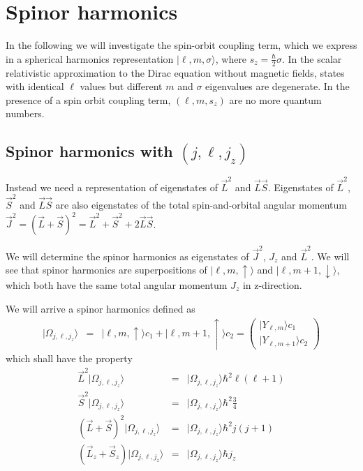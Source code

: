 \documentclass[11pt,a4paper]{report}
\begin{document}
%
\chapter{Spinor harmonics}
In the following we will investigate the spin-orbit coupling term,
which we express in a spherical harmonics representation
$|\ell,m,\sigma\rangle$, where $s_z=\frac{\hbar}{2}\sigma$.  In the
scalar relativistic approximation to the Dirac equation without
magnetic fields, states with identical $\ell$ values but different $m$
and $\sigma$ eigenvalues are degenerate. In the presence of a spin
orbit coupling term, $(\ell,m,s_z)$ are no more quantum numbers.

\section{Spinor harmonics with $(j,\ell,j_z)$}
Instead we need a representation of eigenstates of $\vec{L}^2$ and
$\vec{L}\vec{S}$.  Eigenstates of $\vec{L}^2$, $\vec{S}^2$ and
$\vec{L}\vec{S}$ are also eigenstates of the total spin-and-orbital
angular momentum
$\vec{J}^2=(\vec{L}+\vec{S})^2=\vec{L}^2+\vec{S}^2+2\vec{L}\vec{S}$.

We will determine the spinor harmonics as eigenstates of $\vec{J}^2$,
$J_z$ and $\vec{L}^2$. We will see that spinor harmonics are
superpositions of $|\ell,m,\uparrow\rangle$ and
$|\ell,m+1,\downarrow\rangle$, which both have the same total angular
momentum $J_z$ in z-direction.

We will arrive a spinor harmonics defined as 
\begin{eqnarray}
|\Omega_{j,\ell,j_z}\rangle&=&
|\ell,m,\uparrow\rangle c_1+|\ell,m+1,\uparrow\rangle c_2=
\left(\begin{array}{c}|Y_{\ell,m}\rangle c_1\\|Y_{\ell,m+1}\rangle c_2
\end{array}\right)
\label{eq:ansatzspinorharmonics}
\end{eqnarray}
which shall have the property
\begin{eqnarray*}
\vec{L}^2|\Omega_{j,\ell,j_z}\rangle&=&|\Omega_{j,\ell,j_z}\rangle\hbar^2\ell(\ell+1)
\\
\vec{S}^2|\Omega_{j,\ell,j_z}\rangle&=&|\Omega_{j,\ell,j_z}\rangle\hbar^2\frac{3}{4}
\\
\left(\vec{L}+\vec{S}\right)^2|\Omega_{j,\ell,j_z}\rangle
&=&|\Omega_{j,\ell,j_z}\rangle\hbar^2 j(j+1)
\\
\left(\vec{L}_z+\vec{S}_z\right)|\Omega_{j,\ell,j_z}\rangle
&=&|\Omega_{j,\ell,j_z}\rangle\hbar j_z
\end{eqnarray*}
\end{document}

